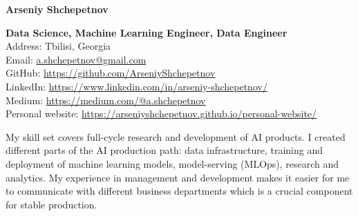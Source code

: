\documentclass[10pt,a4paper]{article}
\newcommand{\vSpace}{0.5cm}
\newcommand{\vacancyName}{PhD student}
\begin{document}
	

	\raggedright{\Large{\textbf{Arseniy Shchepetnov}}}\\[0.3cm]
	
	\begin{minipage}[t]{0.8\textwidth}
		\vspace{0pt}
		\raggedright{\textbf{Data Science, Machine Learning Engineer, Data Engineer}}\\[0.3cm]
		\noindent Address: Tbilisi, Georgia \\[0.1cm]
		\noindent Email: \href{mailto:a.shchepetnov@gmail.com}{a.shchepetnov@gmail.com}\\[0.1cm]
		\noindent GitHub: \href{https://github.com/ArseniyShchepetnov}{https://github.com/ArseniyShchepetnov}\\
            \noindent LinkedIn: \href{https://www.linkedin.com/in/arseniy-shchepetnov/}{https://www.linkedin.com/in/arseniy-shchepetnov/}\\
            \noindent Medium: \href{https://medium.com/@a.shchepetnov}{https://medium.com/@a.shchepetnov} \\
            \noindent Personal website: \href{https://arseniyshchepetnov.github.io/personal-website/}{https://arseniyshchepetnov.github.io/personal-website/}
	\end{minipage}

 
\vspace{\vSpace}

\begin{minipage}[t]{1\textwidth}
\vspace{0pt}
\quad My skill set covers full-cycle research and development of AI products. I created different parts of the AI production path: data infrastructure, training and deployment of machine learning models, model-serving (MLOps), research and analytics. My experience in management and development makes it easier for me to communicate with different business departments which is a crucial component for stable production.   
\quad 
\end{minipage}
	
\end{document}
